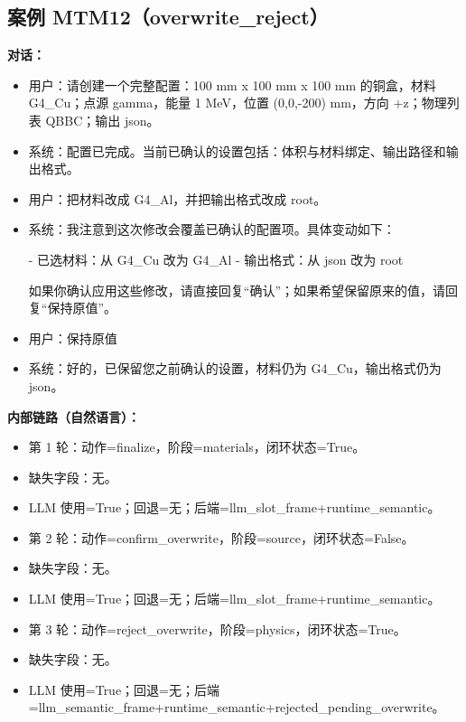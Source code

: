\documentclass[11pt]{ctexart}
\begin{document}
\subsection{案例 MTM12（overwrite\_reject）}
\textbf{对话：}
\begin{itemize}
\item 用户：请创建一个完整配置：100 mm x 100 mm x 100 mm 的铜盒，材料 G4\_Cu；点源 gamma，能量 1 MeV，位置 (0,0,-200) mm，方向 +z；物理列表 QBBC；输出 json。
\item 系统：配置已完成。当前已确认的设置包括：体积与材料绑定、输出路径和输出格式。
\item 用户：把材料改成 G4\_Al，并把输出格式改成 root。
\item 系统：我注意到这次修改会覆盖已确认的配置项。具体变动如下：

- 已选材料：从 G4\_Cu 改为 G4\_Al
- 输出格式：从 json 改为 root

如果你确认应用这些修改，请直接回复“确认”；如果希望保留原来的值，请回复“保持原值”。
\item 用户：保持原值
\item 系统：好的，已保留您之前确认的设置，材料仍为 G4\_Cu，输出格式仍为 json。
\end{itemize}
\textbf{内部链路（自然语言）：}
\begin{itemize}
\item 第 1 轮：动作=finalize，阶段=materials，闭环状态=True。
\item 缺失字段：无。
\item LLM 使用=True；回退=无；后端=llm\_slot\_frame+runtime\_semantic。
\item 第 2 轮：动作=confirm\_overwrite，阶段=source，闭环状态=False。
\item 缺失字段：无。
\item LLM 使用=True；回退=无；后端=llm\_slot\_frame+runtime\_semantic。
\item 第 3 轮：动作=reject\_overwrite，阶段=physics，闭环状态=True。
\item 缺失字段：无。
\item LLM 使用=True；回退=无；后端=llm\_semantic\_frame+runtime\_semantic+rejected\_pending\_overwrite。
\end{itemize}
\end{document}
